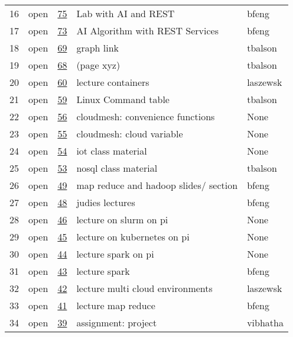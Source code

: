\begin{center}
\begin{longtable}{lllll}
16 & open & \href{https://github.com/cloudmesh/book/issues/75}{75} & Lab with AI and REST & bfeng\\
17 & open & \href{https://github.com/cloudmesh/book/issues/73}{73} & AI Algorithm with REST Services & bfeng\\
18 & open & \href{https://github.com/cloudmesh/book/issues/69}{69} & graph link & tbalson\\
19 & open & \href{https://github.com/cloudmesh/book/issues/68}{68} & (page xyz) & tbalson\\
20 & open & \href{https://github.com/cloudmesh/book/issues/60}{60} & lecture containers & laszewsk\\
21 & open & \href{https://github.com/cloudmesh/book/issues/59}{59} & Linux Command table & tbalson\\
22 & open & \href{https://github.com/cloudmesh/book/issues/56}{56} & cloudmesh: convenience functions & None\\
23 & open & \href{https://github.com/cloudmesh/book/issues/55}{55} & cloudmesh: cloud variable & None\\
24 & open & \href{https://github.com/cloudmesh/book/issues/54}{54} & iot class material & None\\
25 & open & \href{https://github.com/cloudmesh/book/issues/53}{53} & nosql class material & tbalson\\
26 & open & \href{https://github.com/cloudmesh/book/issues/49}{49} & map reduce and hadoop slides/ section & bfeng\\
27 & open & \href{https://github.com/cloudmesh/book/issues/48}{48} & judies lectures & bfeng\\
28 & open & \href{https://github.com/cloudmesh/book/issues/46}{46} & lecture on slurm on pi & None\\
29 & open & \href{https://github.com/cloudmesh/book/issues/45}{45} & lecture on kubernetes on pi & None\\
30 & open & \href{https://github.com/cloudmesh/book/issues/44}{44} & lecture spark on pi & None\\
31 & open & \href{https://github.com/cloudmesh/book/issues/43}{43} & lecture spark & bfeng\\
32 & open & \href{https://github.com/cloudmesh/book/issues/42}{42} & lecture multi cloud environments & laszewsk\\
33 & open & \href{https://github.com/cloudmesh/book/issues/41}{41} & lecture map reduce & bfeng\\
34 & open & \href{https://github.com/cloudmesh/book/issues/39}{39} & assignment: project & vibhatha\\

\end{longtable}
\end{center}
